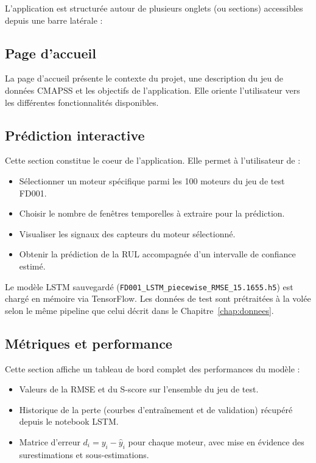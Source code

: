 \documentclass[12pt,a4paper]{report}
\theoremstyle{definition}
\begin{document}
L'application est structurée autour de plusieurs onglets (ou sections) accessibles depuis une barre latérale :

\subsection{Page d'accueil}

La page d'accueil présente le contexte du projet, une description du jeu de données CMAPSS et les objectifs de l'application. Elle oriente l'utilisateur vers les différentes fonctionnalités disponibles.

\subsection{Prédiction interactive}

Cette section constitue le coeur de l'application. Elle permet à l'utilisateur de :
\begin{itemize}
    \item Sélectionner un moteur spécifique parmi les 100 moteurs du jeu de test FD001.
    \item Choisir le nombre de fenêtres temporelles à extraire pour la prédiction.
    \item Visualiser les signaux des capteurs du moteur sélectionné.
    \item Obtenir la prédiction de la RUL accompagnée d'un intervalle de confiance estimé.
\end{itemize}

Le modèle LSTM sauvegardé (\texttt{FD001\_LSTM\_piecewise\_RMSE\_15.1655.h5}) est chargé en mémoire via TensorFlow. Les données de test sont prétraitées à la volée selon le même pipeline que celui décrit dans le Chapitre~\ref{chap:donnees}.

\subsection{Métriques et performance}

Cette section affiche un tableau de bord complet des performances du modèle :
\begin{itemize}
    \item Valeurs de la RMSE et du S-score sur l'ensemble du jeu de test.
    \item Historique de la perte (courbes d'entraînement et de validation) récupéré depuis le notebook LSTM.
    \item Matrice d'erreur $d_i = y_i - \hat{y}_i$ pour chaque moteur, avec mise en évidence des surestimations et sous-estimations.
\end{itemize}
\end{document}
